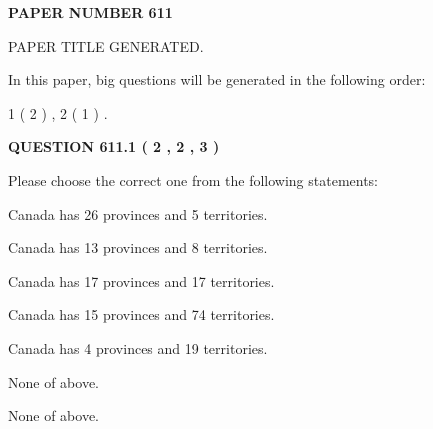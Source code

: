 \documentclass[12pt]{article}
\begin{document}
   
   
   
\newpage 
\setcounter{page}{ 
   611001 } 
   
   
   
   
 {\textbf{ \Large{ PAPER NUMBER  611  }}}
   
   
\vspace{0.2in}
   
   
   
   
   
   
   
   
 \vspace{0.2in}
 
 
 
 
   
   
 PAPER TITLE GENERATED.
   
   
   
\vspace{0.2in}
   
In this paper, big questions will be generated in the following order: 
   
   
   1 ( 2 )
 ,
   2 ( 1 )
 .
  
\vspace{0.2in}
  
{\textbf{\Large{QUESTION
611.1 
 ( 2 , 2 , 3 )
}}}
  
  
Please choose the correct one from the following statements:
 
 
Canada has  26 provinces and  5 territories.
 
 
Canada has  13 provinces and  8 territories.
 
 
Canada has  17 provinces and  17 territories.
 
 
Canada has  15 provinces and  74 territories.
 
 
Canada has   4 provinces and  19 territories.
 
 
 None of above.
 
 
\noindent{}
 
 
 None of above.
 
 
\noindent{}
 
\end{document}
